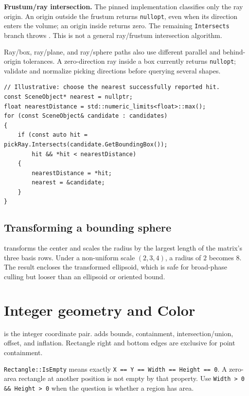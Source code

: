 \begin{limitationnote}
\textbf{Frustum/ray intersection.} The pinned implementation classifies only the ray origin. An
origin outside the frustum returns \texttt{nullopt}, even when its direction enters the volume;
an origin inside returns zero. The remaining \texttt{Intersects} branch throws
. This is not a general ray/frustum intersection algorithm.
\end{limitationnote}

Ray/box, ray/plane, and ray/sphere paths also use different parallel and behind-origin
tolerances. A zero-direction ray inside a box currently returns \texttt{nullopt}; validate and
normalize picking directions before querying several shapes.

\begin{lstlisting}
// Illustrative: choose the nearest successfully reported hit.
const SceneObject* nearest = nullptr;
float nearestDistance = std::numeric_limits<float>::max();
for (const SceneObject& candidate : candidates)
{
    if (const auto hit = pickRay.Intersects(candidate.GetBoundingBox());
        hit && *hit < nearestDistance)
    {
        nearestDistance = *hit;
        nearest = &candidate;
    }
}
\end{lstlisting}

\subsection{Transforming a bounding sphere}

 transforms the center and scales the radius by the largest
length of the matrix's three basis rows. Under a non-uniform scale $(2,3,4)$, a radius of $2$
becomes $8$. The result encloses the transformed ellipsoid, which is safe for broad-phase
culling but looser than an ellipsoid or oriented bound.

\section{Integer geometry and Color}

 is the integer coordinate pair.  adds bounds, containment,
intersection/union, offset, and inflation. Rectangle right and bottom edges are exclusive for
point containment.

\texttt{Rectangle::IsEmpty} means exactly \texttt{X == Y == Width == Height == 0}. A zero-area
rectangle at another position is not empty by that property. Use
\texttt{Width > 0 \&\& Height > 0} when the question is whether a region has area.

